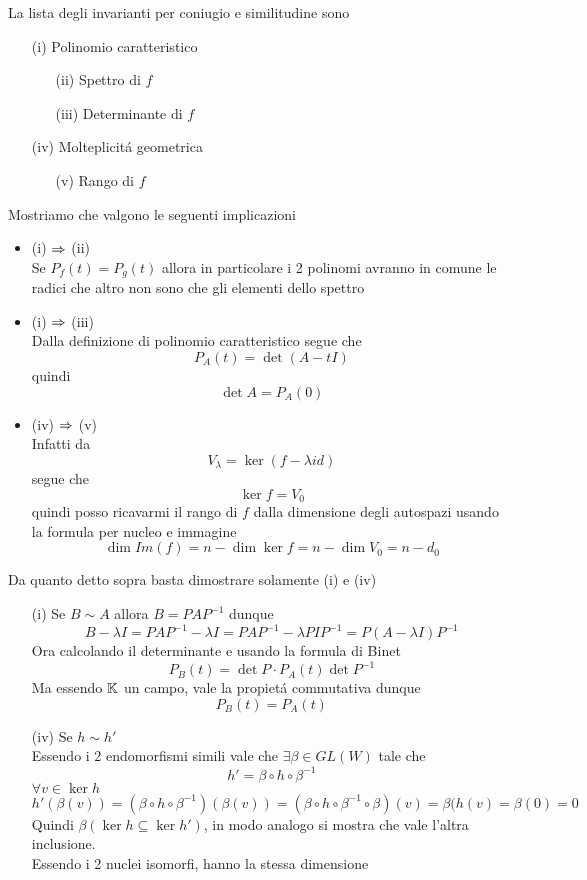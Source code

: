 \begin{prop}[Invarianti] \bianco
La lista degli invarianti per coniugio e similitudine sono
\begin{itemize}
\item[(i)] Polinomio caratteristico 
\begin{itemize}
\item[(ii)] Spettro di $f$   
\item[(iii)] Determinante di $f$
\end{itemize}
\item[(iv)] Molteplicit\'a geometrica
\begin{itemize}
\item[(v)] Rango di $f$
\end{itemize}

\end{itemize}
\proof Mostriamo che valgono le seguenti implicazioni
\begin{itemize}
\item (i) $ \Rightarrow $ (ii) \\
Se $P_f(t)=P_g(t)$ allora in particolare i 2 polinomi avranno in comune le radici che altro non sono che gli elementi dello spettro
\item (i) $\Rightarrow $ (iii)\\
Dalla definizione di polinomio caratteristico segue che 
$$P_A(t) = \det ( A -tI) $$ quindi
$$ \det A = P_A(0) $$
\item (iv) $\Rightarrow$ (v) \\
Infatti da 
$$V_{\lambda}= \ker (f - \lambda id ) $$ 
segue che
$$ \ker f = V_0$$ 
quindi posso ricavarmi il rango di $f$ dalla dimensione degli autospazi usando la formula per nucleo e immagine
$$ \dim Im(f)=n-\dim \ker f= n-\dim V_0 = n -d_0 $$
\end{itemize}
Da quanto detto sopra basta dimostrare solamente (i) e (iv)
\begin{itemize}
\item[(i)]Se $B\sim A $ allora $B= PAP^{-1} $ dunque
$$ B-\lambda I = PAP^{-1} - \lambda I = PAP^{-1} - \lambda PIP^{-1} = P ( A - \lambda I ) P^{-1} $$
Ora calcolando il determinante e usando la formula di Binet
$$ P_B(t) = \det P \cdot P_A(t) \det P ^{-1} $$ 
Ma essendo $\mathbb{K}$ un campo, vale la propiet\'a commutativa dunque
$$ P_B(t)=P_A(t) $$
\item[(iv)] Se $h \sim h' $\\

Essendo i 2 endomorfismi simili vale che $\exists \beta \in GL(W) $ tale che
$$ h' = \beta \circ h \circ \beta^{-1} $$
$\forall v \in \ker h $ 
$$ h'(\beta (v)) = ( \beta \circ h\circ \beta^{-1})(\beta (v))= ( \beta \circ h\circ \beta^{-1} \circ \beta )(v) = \beta(h(v)=\beta(0)=0$$
Quindi $\beta (\ker h \subseteq \ker h')$, in modo analogo si mostra che vale l'altra inclusione.\\
Essendo i 2 nuclei isomorfi, hanno la stessa dimensione

\end{itemize}
\endproof
\end{prop}

